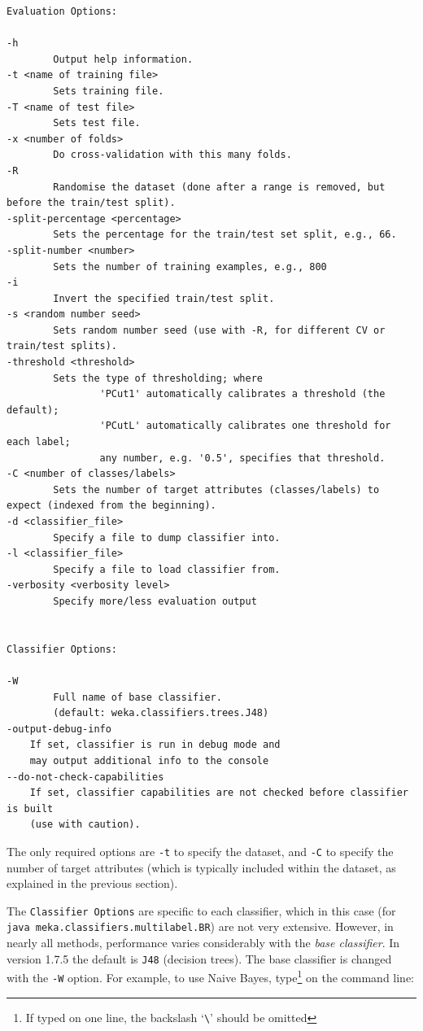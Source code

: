 \documentclass[11pt]{article}
\begin{document}
{\small
\begin{lstlisting}
Evaluation Options:

-h
        Output help information.
-t <name of training file>
        Sets training file.
-T <name of test file>
        Sets test file.
-x <number of folds>
        Do cross-validation with this many folds.
-R
        Randomise the dataset (done after a range is removed, but before the train/test split).
-split-percentage <percentage>
        Sets the percentage for the train/test set split, e.g., 66.
-split-number <number>
        Sets the number of training examples, e.g., 800
-i
        Invert the specified train/test split.
-s <random number seed>
        Sets random number seed (use with -R, for different CV or train/test splits).
-threshold <threshold>
        Sets the type of thresholding; where
                'PCut1' automatically calibrates a threshold (the default);
                'PCutL' automatically calibrates one threshold for each label;
                any number, e.g. '0.5', specifies that threshold.
-C <number of classes/labels>
        Sets the number of target attributes (classes/labels) to expect (indexed from the beginning).
-d <classifier_file>
        Specify a file to dump classifier into.
-l <classifier_file>
        Specify a file to load classifier from.
-verbosity <verbosity level>
        Specify more/less evaluation output


Classifier Options:

-W
        Full name of base classifier.
        (default: weka.classifiers.trees.J48)
-output-debug-info
	If set, classifier is run in debug mode and
	may output additional info to the console
--do-not-check-capabilities
	If set, classifier capabilities are not checked before classifier is built
	(use with caution).
\end{lstlisting}
}

The only required options are \texttt{-t} to specify the dataset, and \texttt{-C} to specify the number of target attributes (which is typically included within the dataset, as explained in the previous section).  

The \texttt{Classifier Options} are specific to each classifier, which in this case (for \texttt{java meka.classifiers.multilabel.BR}) are not very extensive. However, in nearly all methods, performance varies considerably with the \emph{base classifier}. In version 1.7.5 the default is \texttt{J48} (decision trees). The base classifier is changed with the \texttt{-W} option. For example, to use Naive Bayes, type\footnote{If typed on one line, the backslash `\texttt{\textbackslash}' should be omitted} on the command line:
\end{document}

